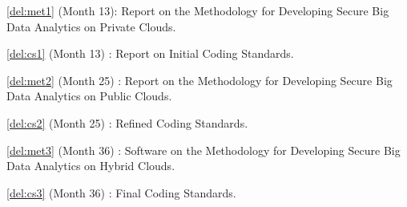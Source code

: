 \begin{Workpackage}{\thewpno}
%	
%	
%	




\begin{WPDeliverables}
\begin{compactitem}
\item \ref{del:met1} (Month 13): Report on the Methodology for Developing Secure Big Data Analytics on Private Clouds.
\item \ref{del:cs1} (Month 13) : Report on Initial \TheProject{} Coding Standards.
\item \ref{del:met2} (Month 25) : Report on the Methodology for Developing Secure Big Data Analytics on Public Clouds.
\item \ref{del:cs2} (Month 25) : Refined \TheProject{} Coding Standards.
\item \ref{del:met3} (Month 36) : Software on the Methodology for Developing Secure Big Data Analytics on Hybrid Clouds.
\item \ref{del:cs3} (Month 36) : Final \TheProject{} Coding Standards.
\end{compactitem}
\end{WPDeliverables}
\end{Workpackage}
